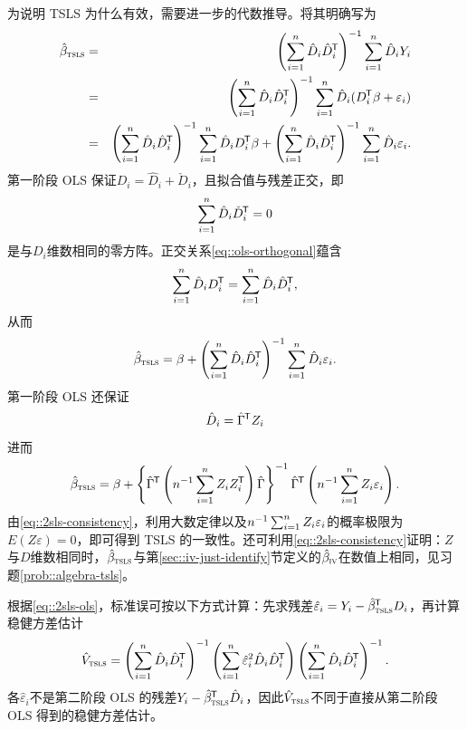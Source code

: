 为说明 TSLS 为什么有效，需要进一步的代数推导。将其明确写为
\begin{eqnarray} 
\hat{\beta}_\textsc{tsls} &=& \left(  \sum_{i=1}^n \hat{D}_i\hat{D}_i^{\mkern-1.5mu\mathsf{T}} \right) ^{-1} 
\sum_{i=1}^n \hat{D}_i Y_i  \label{eq::2sls-definition} \\
&=& \left(  \sum_{i=1}^n \hat{D}_i\hat{D}_i^{\mkern-1.5mu\mathsf{T}} \right) ^{-1} 
\sum_{i=1}^n \hat{D}_i (D_i ^{\mkern-1.5mu\mathsf{T}} \beta + \varepsilon_i)  \nonumber  \\
&=& \left(  \sum_{i=1}^n \hat{D}_i\hat{D}_i^{\mkern-1.5mu\mathsf{T}} \right) ^{-1} 
\sum_{i=1}^n \hat{D}_i D_i ^{\mkern-1.5mu\mathsf{T}} \beta + \left(  \sum_{i=1}^n \hat{D}_i\hat{D}_i^{\mkern-1.5mu\mathsf{T}} \right) ^{-1} \sum_{i=1}^n \hat{D}_i  \varepsilon_i .   \nonumber 
\end{eqnarray}
第一阶段 OLS 保证$D_i  = \hat{D}_i + \check D_i$，且拟合值与残差正交，即
\begin{equation} \label{eq::ols-orthogonal}
\sum_{i=1}^n \hat{D}_i  \check D_i^{\mkern-1.5mu\mathsf{T}} = 0
\end{equation}
是与$D_i$维数相同的零方阵。正交关系\eqref{eq::ols-orthogonal}蕴含
$$
\sum_{i=1}^n \hat{D}_i D_i ^{\mkern-1.5mu\mathsf{T}} = \sum_{i=1}^n \hat{D}_i\hat{D}_i^{\mkern-1.5mu\mathsf{T}},
$$
从而
\begin{eqnarray}
\label{eq::2sls-ols}
\hat{\beta}_\textsc{tsls} = \beta + \left(  \sum_{i=1}^n \hat{D}_i\hat{D}_i^{\mkern-1.5mu\mathsf{T}} \right) ^{-1} \sum_{i=1}^n \hat{D}_i  \varepsilon_i.
\end{eqnarray}
第一阶段 OLS 还保证
\begin{equation}
\label{eq::ols-donz}
\hat{D}_i = \hat{\Gamma}^{\mkern-1.5mu\mathsf{T}}  Z_i 
\end{equation}
进而
\begin{eqnarray}
\label{eq::2sls-consistency}
\hat{\beta}_\textsc{tsls} = \beta + \left\{  \hat{\Gamma}^{\mkern-1.5mu\mathsf{T}}  \left(  n^{-1}  \sum_{i=1}^n Z_i Z_i^{\mkern-1.5mu\mathsf{T}}  \right) \hat{\Gamma}  \right\}  ^{-1}  
\hat{\Gamma}^{\mkern-1.5mu\mathsf{T}}  \left( n^{-1} \sum_{i=1}^n Z_i  \varepsilon_i \right) . 
\end{eqnarray}
由\eqref{eq::2sls-consistency}，利用大数定律以及$n^{-1} \sum_{i=1}^n Z_i  \varepsilon_i $的概率极限为$E(Z\varepsilon) = 0$，即可得到 TSLS 的一致性。还可利用\eqref{eq::2sls-consistency}证明：$Z$与$D$维数相同时，$\hat{\beta}_\textsc{tsls} $与第\ref{sec::iv-just-identify}节定义的$\hat{\beta}_\textsc{iv} $在数值上相同，见习题\ref{prob::algebra-tsls}。 




根据\eqref{eq::2sls-ols}，标准误可按以下方式计算：先求残差$\hat{\varepsilon}_i = Y_i - \hat{\beta}_\textsc{tsls}^{\mkern-1.5mu\mathsf{T}} D_i$，再计算稳健方差估计
$$
\hat{V}_\textsc{tsls} = \left( \sum_{i=1}^n  \hat{D}_i \hat{D}_i^{\mkern-1.5mu\mathsf{T}}  \right)^{-1}
 \left( \sum_{i=1}^n \hat{\varepsilon}_i ^2  \hat{D}_i \hat{D}_i^{\mkern-1.5mu\mathsf{T}}  \right)
\left( \sum_{i=1}^n  \hat{D}_i \hat{D}_i^{\mkern-1.5mu\mathsf{T}}  \right)^{-1} . 
$$
各$\hat{\varepsilon}_i$不是第二阶段 OLS 的残差$  Y_i - \hat{\beta}_\textsc{tsls}^{\mkern-1.5mu\mathsf{T}} \hat{D}_i $，因此$\hat{V}_\textsc{tsls} $不同于直接从第二阶段 OLS 得到的稳健方差估计。 




